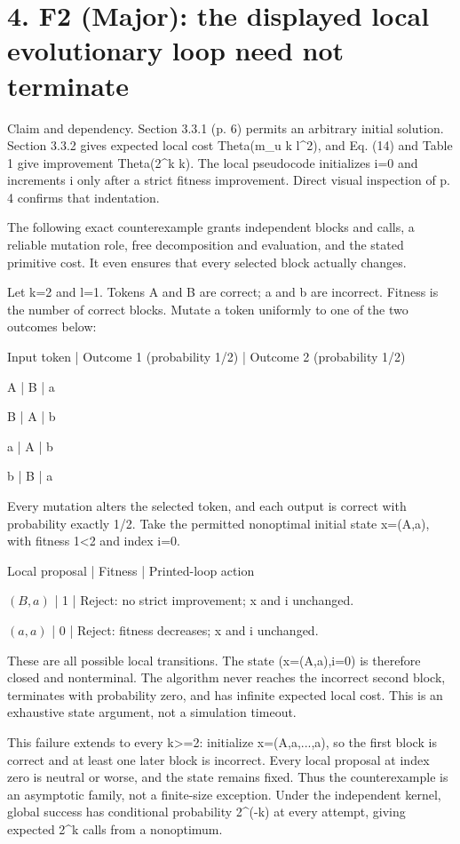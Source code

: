 \documentclass[10pt]{article}
\begin{document}
\section*{4. F2 (Major): the displayed local evolutionary loop need not terminate}
Claim and dependency. Section 3.3.1 (p. 6) permits an arbitrary initial solution. Section 3.3.2 gives expected local cost Theta(m\_u k l\textasciicircum{}2), and Eq. (14) and Table 1 give improvement Theta(2\textasciicircum{}k k). The local pseudocode initializes i=0 and increments i only after a strict fitness improvement. Direct visual inspection of p. 4 confirms that indentation.\par
The following exact counterexample grants independent blocks and calls, a reliable mutation role, free decomposition and evaluation, and the stated primitive cost. It even ensures that every selected block actually changes.\par
Let k=2 and l=1. Tokens A and B are correct; a and b are incorrect. Fitness is the number of correct blocks. Mutate a token uniformly to one of the two outcomes below:\par
Input token | Outcome 1 (probability 1/2) | Outcome 2 (probability 1/2)\par
A | B | a\par
B | A | b\par
a | A | b\par
b | B | a\par
Every mutation alters the selected token, and each output is correct with probability exactly 1/2. Take the permitted nonoptimal initial state x=(A,a), with fitness 1<2 and index i=0.\par
Local proposal | Fitness | Printed-loop action\par
\((B,a)\) | 1 | Reject: no strict improvement; x and i unchanged.\par
\((a,a)\) | 0 | Reject: fitness decreases; x and i unchanged.\par
These are all possible local transitions. The state (x=(A,a),i=0) is therefore closed and nonterminal. The algorithm never reaches the incorrect second block, terminates with probability zero, and has infinite expected local cost. This is an exhaustive state argument, not a simulation timeout.\par
This failure extends to every k>=2: initialize x=(A,a,...,a), so the first block is correct and at least one later block is incorrect. Every local proposal at index zero is neutral or worse, and the state remains fixed. Thus the counterexample is an asymptotic family, not a finite-size exception. Under the independent kernel, global success has conditional probability 2\textasciicircum{}(-k) at every attempt, giving expected 2\textasciicircum{}k calls from a nonoptimum.\par
\end{document}
